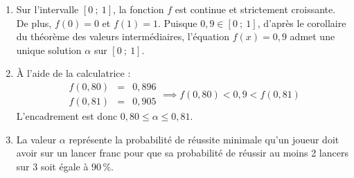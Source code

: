 \begin{enumerate}
\begin{enumerate}
\item Sur l'intervalle $[0~;~1]$, la fonction $f$ est continue et strictement croissante. De plus, $f(0) = 0$ et $f(1) = 1$. Puisque $0,9 \in [0~;~1]$, d'après le corollaire du théorème des valeurs intermédiaires, l'équation $f(x) = 0,9$ admet une unique solution $\alpha$ sur $[0~;~1]$.

\item À l'aide de la calculatrice :
\[
\begin{array}{rcl}
f(0,80) &=& 0,896\\
f(0,81) &=& 0,905
\end{array} \implies f(0,80) < 0,9 < f(0,81)
\]
L'encadrement est donc $0,80 \leqslant \alpha \leqslant 0,81$.

	\item La valeur $\alpha$ représente la probabilité de réussite minimale qu'un joueur doit avoir sur un lancer franc pour que sa probabilité de réussir au moins 2 lancers sur 3 soit égale à $90\,\%$.
	\end{enumerate}
\end{enumerate}
